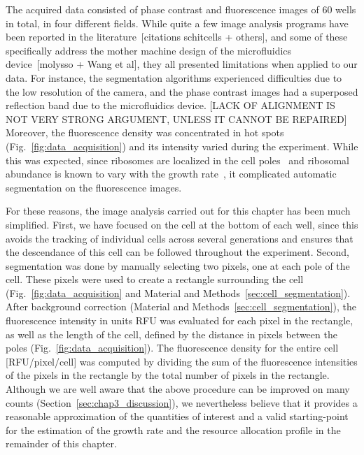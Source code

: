 The acquired data consisted of phase contrast and fluorescence images of 60 wells in total, in four different fields.
While quite a few image analysis programs have been reported in the literature~[citations schitcells + others], and some of these specifically address the mother machine design of the microfluidics device~[molysso + Wang et al], they all presented limitations when applied to our data.
For instance, the segmentation algorithms experienced difficulties due to the low resolution of the camera, and the phase contrast images had a superposed reflection band due to the microfluidics device. [LACK OF ALIGNMENT IS NOT VERY STRONG ARGUMENT, UNLESS IT CANNOT BE REPAIRED]
Moreover, the fluorescence density was concentrated in hot spots (Fig.~\ref{fig:data_acquisition}) and its intensity varied during the experiment. 
While this was expected, since ribosomes are localized in the cell poles~\cite{bakshi_superresolution_2012} and ribosomal abundance is known to vary with the growth rate~\cite{scott_interdependence_2010}, it complicated automatic segmentation on the fluorescence images.

For these reasons, the image analysis carried out for this chapter has been much simplified. 
First, we have focused on the cell at the bottom of each well, since this avoids the tracking of individual cells across several generations and ensures that the descendance of this cell can be followed throughout the experiment.
Second, segmentation was done by manually selecting two pixels, one at each pole of the cell.
These pixels were used to create a rectangle surrounding the cell (Fig.~\ref{fig:data_acquisition} and Material and Methods~\ref{sec:cell_segmentation}).
After background correction (Material and Methods~\ref{sec:cell_segmentation}), the fluorescence intensity in units RFU was evaluated for each pixel in the rectangle, as well as the length of the cell, defined by the distance in pixels between the poles (Fig.~\ref{fig:data_acquisition}).
The fluorescence density for the entire cell [RFU/pixel/cell] was computed by dividing the sum of the fluorescence intensities of the pixels in the rectangle by the total number of pixels in the rectangle.
Although we are well aware that the above procedure can be improved on many counts (Section~\ref{sec:chap3_discussion}), we nevertheless believe that it provides a reasonable approximation of the quantities of interest and a valid starting-point for the estimation of the growth rate and the resource allocation profile in the remainder of this chapter.   


